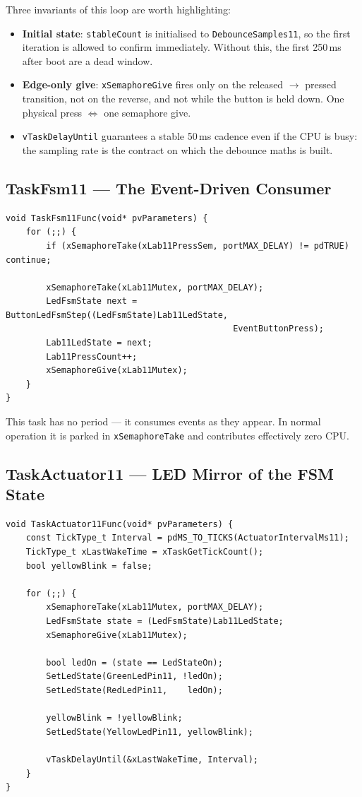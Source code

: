 \documentclass[12pt]{article}
\begin{document}
Three invariants of this loop are worth highlighting:
\begin{itemize}
  \item \textbf{Initial state}: \texttt{stableCount} is initialised to \texttt{DebounceSamples11}, so the first iteration is allowed to confirm immediately. Without this, the first 250\,ms after boot are a dead window.
  \item \textbf{Edge-only give}: \texttt{xSemaphoreGive} fires only on the released $\to$ pressed transition, not on the reverse, and not while the button is held down. One physical press $\Leftrightarrow$ one semaphore give.
  \item \texttt{vTaskDelayUntil} guarantees a stable 50\,ms cadence even if the CPU is busy: the sampling rate is the contract on which the debounce maths is built.
\end{itemize}

\subsection{TaskFsm11 --- The Event-Driven Consumer}

\begin{lstlisting}[caption={TaskFsm11.cpp --- block on semaphore, run one transition}]
void TaskFsm11Func(void* pvParameters) {
    for (;;) {
        if (xSemaphoreTake(xLab11PressSem, portMAX_DELAY) != pdTRUE) continue;

        xSemaphoreTake(xLab11Mutex, portMAX_DELAY);
        LedFsmState next = ButtonLedFsmStep((LedFsmState)Lab11LedState,
                                             EventButtonPress);
        Lab11LedState = next;
        Lab11PressCount++;
        xSemaphoreGive(xLab11Mutex);
    }
}
\end{lstlisting}

This task has no period --- it consumes events as they appear. In normal operation it is parked in \texttt{xSemaphoreTake} and contributes effectively zero CPU.

\subsection{TaskActuator11 --- LED Mirror of the FSM State}

\begin{lstlisting}[caption={TaskActuator11.cpp --- drive LEDs from current state}]
void TaskActuator11Func(void* pvParameters) {
    const TickType_t Interval = pdMS_TO_TICKS(ActuatorIntervalMs11);
    TickType_t xLastWakeTime = xTaskGetTickCount();
    bool yellowBlink = false;

    for (;;) {
        xSemaphoreTake(xLab11Mutex, portMAX_DELAY);
        LedFsmState state = (LedFsmState)Lab11LedState;
        xSemaphoreGive(xLab11Mutex);

        bool ledOn = (state == LedStateOn);
        SetLedState(GreenLedPin11, !ledOn);
        SetLedState(RedLedPin11,    ledOn);

        yellowBlink = !yellowBlink;
        SetLedState(YellowLedPin11, yellowBlink);

        vTaskDelayUntil(&xLastWakeTime, Interval);
    }
}
\end{lstlisting}
\end{document}
